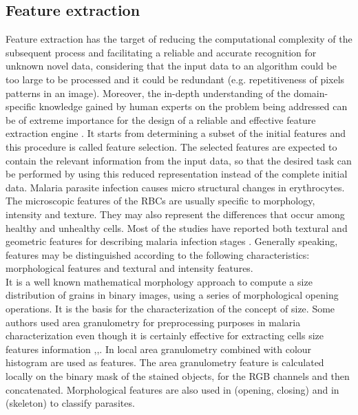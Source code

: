 \documentclass[sensors,review,submit,moreauthors,pdftex,10pt,a4paper]{mdpi}
\begin{document}
\subsection{Feature extraction}
Feature extraction has the target of reducing the computational complexity of the subsequent process and facilitating a reliable and accurate recognition for unknown novel data, considering that the input data to an algorithm could be too large to be processed and it could be redundant (e.g. repetitiveness of pixels patterns in an image). Moreover, the in-depth understanding of the domain-specific knowledge gained by human experts on the problem being addressed can be of extreme importance for the design of a reliable and effective feature extraction engine \cite{Jiang2009}.
It starts from determining a subset of the initial features and this procedure is called feature selection. The selected features are expected to contain the relevant information from the input data, so that the desired task can be performed by using this reduced representation instead of the complete initial data.
Malaria parasite infection causes micro structural changes in erythrocytes. The microscopic features of the RBCs are usually specific to morphology, intensity and texture. They may also represent the differences that occur among healthy and unhealthy cells. Most of the studies have reported both textural and geometric features for describing malaria infection stages \cite{Das2015}.
Generally speaking, features may be distinguished according to the following characteristics: morphological features and textural and intensity features.\\
It is a well known mathematical morphology approach to compute a size distribution of grains in binary images, using a series of morphological opening operations. It is the basis for the characterization of the concept of size. Some authors used area granulometry for preprocessing purposes in malaria characterization \cite{Tek2010} even though it is certainly effective for extracting cells size features information \cite{Tek2006},\cite{Malihi2013},\cite{Springl2009}. In \cite{Tek2010} local area granulometry combined with colour histogram are used as features. The area granulometry feature is calculated locally on the binary mask of the stained objects, for the RGB channels and then concatenated. Morphological features are also used
in \cite{Das2011} (opening, closing) and in \cite{DiRuberto2002} (skeleton) to classify parasites.

%
\end{document}
